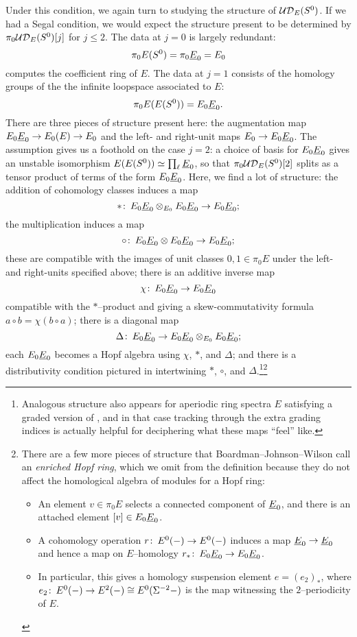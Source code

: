 Under this condition, we again turn to studying the structure of $\mathcal{UD}_E(S^0)$.  If we had a Segal condition, we would expect the structure present to be determined by $\pi_0 \mathcal{UD}_E(S^0)[j]$ for $j \le 2$.  The data at $j = 0$ is largely redundant: \[\pi_0 E(S^0) = \pi_0 \underline{\smash{E}}_{0} = E_0\] computes the coefficient ring of $E$.  The data at $j = 1$ consists of the homology groups of the the infinite loopspace associated to $E$: \[\pi_0 E(E(S^0)) = E_0 \underline{\smash{E}}_{0}.\]  There are three pieces of structure present here: the augmentation map $E_0 \underline{\smash{E}}_{0} \to E_0(E) \to E_0$ and the left- and right-unit maps $E_0 \to E_0 \underline{\smash{E}}_{0}$.  The assumption {\UFH} gives us a foothold on the case $j = 2$: a choice of basis for $E_0 \underline{\smash{E}}_{0}$ gives an unstable isomorphism $E(E(S^0)) \simeq \prod_\ell \underline{\smash{E}}_{0}$, so that $\pi_0 \mathcal{UD}_E(S^0)[2]$ splits as a tensor product of terms of the form $E_0 \underline{\smash{E}}_{0}$.  Here, we find a lot of structure: the addition of cohomology classes induces a map \[\ast\colon\thinspace E_0 \underline{\smash{E}}_{0} \otimes_{E_0} E_0 \underline{\smash{E}}_{0} \to E_0 \underline{\smash{E}}_{0};\] the multiplication induces a map \[\circ\colon\thinspace E_0 \underline{\smash{E}}_{0} \otimes E_0 \underline{\smash{E}}_{0} \to E_0 \underline{\smash{E}}_{0};\] these are compatible with the images of unit classes $0, 1 \in \pi_0 E$ under the left- and right-units specified above; there is an additive inverse map \[\chi\colon\thinspace E_0 \underline{\smash{E}}_{0} \to E_0 \underline{\smash{E}}_{0}\] compatible with the $\ast$--product and giving a skew-commutativity formula $a \circ b = \chi(b \circ a)$; there is a diagonal map \[\Delta\colon\thinspace E_0 \underline{\smash{E}}_{0} \to E_0 \underline{\smash{E}}_{0} \otimes_{E_0} E_0 \underline{\smash{E}}_{0};\] each $E_0 \underline{\smash{E}}_{0}$ becomes a Hopf algebra using $\chi$, $\ast$, and $\Delta$; and there is a distributivity condition pictured in  intertwining $\ast$, $\circ$, and $\Delta$.\footnote{Analogous structure also appears for aperiodic ring spectra $E$ satisfying a graded version of {\UFH}, and in that case tracking through the extra grading indices is actually helpful for deciphering what these maps ``feel'' like.}\footnote{There are a few more pieces of structure that Boardman--Johnson--Wilson call an \textit{enriched Hopf ring}, which we omit from the definition because they do not affect the homological algebra of modules for a Hopf ring:
\begin{itemize}
\item An element $v \in \pi_0 E$ selects a connected component of $\underline{\smash{E}}_{0}$, and there is an attached element $[v] \in E_0 \underline{\smash{E}}_{0}$.
\item A cohomology operation $r\colon\thinspace E^0(-) \to E^0(-)$ induces a map $\underline{\smash{E}}_{0} \to \underline{\smash{E}}_{0}$ and hence a map on $E$--homology $r_*\colon\thinspace E_0 \underline{\smash{E}}_{0} \to E_0 \underline{\smash{E}}_{0}$.
\item In particular, this gives a homology suspension element $e = (e_2)_*$, where $e_2\colon\thinspace E^0(-) \to E^2(-) \cong E^0(\Sigma^{-2} -)$ is the map witnessing the $2$--periodicity of $E$.
\end{itemize}}

